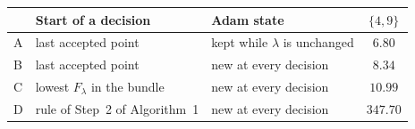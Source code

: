 \begin{tabular}{lllc}
\toprule
 & Start of a decision & Adam state & $\{4,9\}$ \\
\midrule
A & last accepted point & kept while $\lambda$ is unchanged & $6.80$ \\
B & last accepted point & new at every decision & $8.34$ \\
C & lowest $F_\lambda$ in the bundle & new at every decision & $10.99$ \\
D & rule of Step~2 of Algorithm~1 & new at every decision & $347.70$ \\
\bottomrule
\end{tabular}
